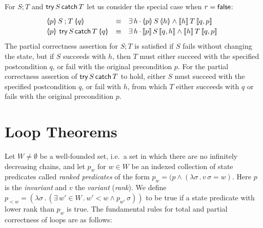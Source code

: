 \documentclass[submission,copyright,creativecommons]{eptcs}
\newcommand{\KW}[1]{\mathop{\sf #1}}
\newcommand{\FALSE}{\KW{false}}
\newcommand{\semi}{\mathbin{;}}
\newcommand{\TRY}{\KW{try}}
\newcommand{\CATCH}{\KW{catch}}
\newcommand{\con}{\wedge}
\renewcommand{\dot}{\mathop{.}}
\newcommand{\TOTAL}[3]{[\hspace{-.15em}[#1]\hspace{-.15em}]\,#2\,[\hspace{-.15em}[#3]\hspace{-.15em}]}
\newcommand{\PARTIAL}[3]{\langle\hspace{-.2em}|#1|\hspace{-.2em}\rangle\,#2\,\langle\hspace{-.2em}|#3|\hspace{-.2em}\rangle}
\begin{document}
For $S \semi T$ and $\TRY S \CATCH T$ let us consider the special case when $r = \FALSE$:
\[\renewcommand{\arraystretch}{1.2}\begin{array}{l@{\quad}l@{\quad}l}
	\PARTIAL{p}{S \semi T}{q} & \equiv & \exists\, h \dot
	  \begin{array}[t]{@{}l}
	    \PARTIAL{p}{S}{h} \con \TOTAL{h}{T}{q, p}
	  \end{array} \\
	\PARTIAL{p}{\TRY S \CATCH T}{q} & \equiv & \exists\, h \dot
	  \begin{array}[t]{@{}l}
	    \TOTAL{p}{S}{q, h} \con \TOTAL{h}{T}{q, p}
	  \end{array} \\
\end{array}\]
The partial correctness assertion for $S \semi T$ is satisfied if $S$ fails without changing the state, but if $S$ succeeds with $h$, then $T$ must either succeed with the specified postcondition $q$, or fail with the original precondition $p$. For the partial correctness assertion of $\TRY S \CATCH T$ to hold, either $S$ must succeed with the specified postcondition $q$, or fail with $h$, from which $T$ either succeeds with $q$ or fails with the original precondition $p$.

\section{Loop Theorems}
\label{sec:loop}

Let $W \neq \emptyset$ be a well-founded set, i.e.~a set in which there are no infinitely decreasing chains, and let $p_w$ for $w \in W$ be an indexed collection of state predicates called \emph{ranked predicates} of the form $p_w = (p \con (\lambda \sigma \dot v\,\sigma = w)$. Here $p$ is the \emph{invariant} and $v$ the \emph{variant} (\emph{rank}). We define $p_{<w} = (\lambda \sigma \dot (\exists\,w' \in W \dot w' < w \con p_{w'}\,\sigma))$ to be true if a state predicate with lower rank than $p_w$ is true. The fundamental rules for total and partial correctness of loops are as follows:
\end{document}

